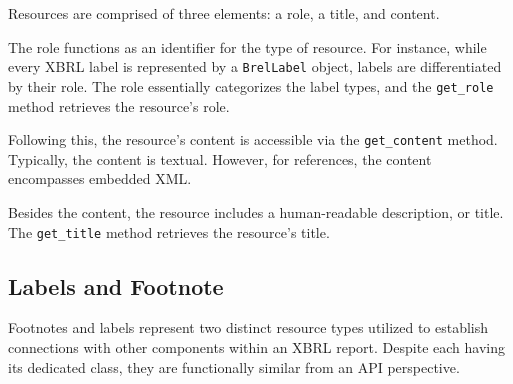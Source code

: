 Resources are comprised of three elements: a role, a title, and content.

The role functions as an identifier for the type of resource.
For instance, while every XBRL label is represented by a \texttt{BrelLabel} object,
labels are differentiated by their role.
The role essentially categorizes the label types,
and the \texttt{get\_role} method retrieves the resource's role.

Following this, the resource's content is accessible via the \texttt{get\_content} method.
Typically, the content is textual.
However, for references, the content encompasses embedded XML.

Besides the content, the resource includes a human-readable description, or title.
The \texttt{get\_title} method retrieves the resource's title.

\subsection{Labels and Footnote}

Footnotes and labels represent two distinct resource types utilized to establish connections with other components within an XBRL report.
Despite each having its dedicated class, they are functionally similar from an API perspective.

